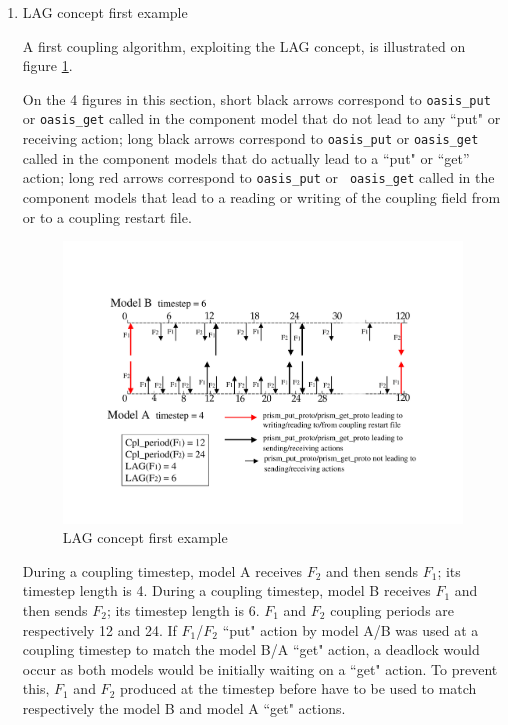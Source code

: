 \begin{enumerate}

\item LAG concept first example
 
  A first coupling algorithm, exploiting the LAG concept, is
  illustrated on figure \ref{fig:lag_concept_1}.

  On the 4 figures in this section, short black arrows correspond to
  {\tt oasis\_put} or {\tt oasis\_get} called in the component model
  that do not lead to any ``put" or receiving action; long black
  arrows correspond to {\tt oasis\_put} or {\tt oasis\_get} called in
  the component models that do actually lead to a ``put" or ``get''
  action; long red arrows correspond to {\tt oasis\_put} or {\tt
    oasis\_get} called in the component models that lead to a reading
  or writing of the coupling field from or to a coupling restart file.

  \begin{figure}
    \includegraphics[scale=.6]{figures/fig_lag_concept_1}
    \caption{LAG concept first example}
    \label{fig:lag_concept_1}
  \end{figure}

  During a coupling timestep, model A receives $F_2$ and then sends
  $F_1$; its timestep length is 4. During a coupling timestep, model B
  receives $F_1$ and then sends $F_2$; its timestep length is 6.
  $F_1$ and $F_2$ coupling periods are respectively 12 and 24. If
  $F_1$/$F_2$ ``put" action by model A/B was used at a coupling
  timestep to match the model B/A ``get" action, a deadlock would
  occur as both models would be initially waiting on a ``get"
  action. To prevent this, $F_1$ and $F_2$ produced at the timestep
  before have to be used to match respectively the model B and model A
  ``get" actions.


\end{enumerate}
